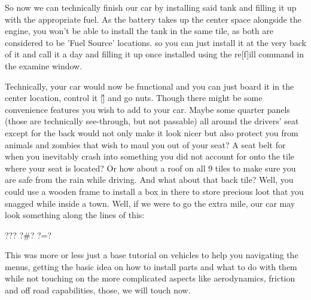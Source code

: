 \documentclass[11pt]{report}
\begin{document}
So now we can technically finish our car by installing said tank and filling it up with the appropriate fuel. As the battery takes up the center space alongside the engine, you won't be able to install the tank in the same tile, as both are considered to be 'Fuel Source' locations. so you can just install it at the very back of it and call it a day and filling it up once installed using the re[f]ill command in the examine window.

Technically, your car would now be functional and you can just board it in the center location, control it [\^] and go nuts. Though there might be some convenience features you wish to add to your car. Maybe some quarter panels (those are technically see-through, but not passable) all around the drivers' seat except for the back would not only make it look nicer but also protect you from animals and zombies that wish to maul you out of your seat? A seat belt for when you inevitably crash into something you did not account for onto the tile where your seat is located? Or how about a roof on all 9 tiles to make sure you are safe from the rain while driving. And what about that back tile? Well, you could use a wooden frame to install a box in there to store precious loot that you snagged while inside a town.
Well, if we were to go the extra mile, our car may look something along the lines of this:

???
?\#?
?=?


This was more or less just a base tutorial on vehicles to help you navigating the menus, getting the basic idea on how to install parts and what to do with them while not touching on the more complicated aspects like aerodynamics, friction and off road capabilities, those, we will touch now.
\end{document}
